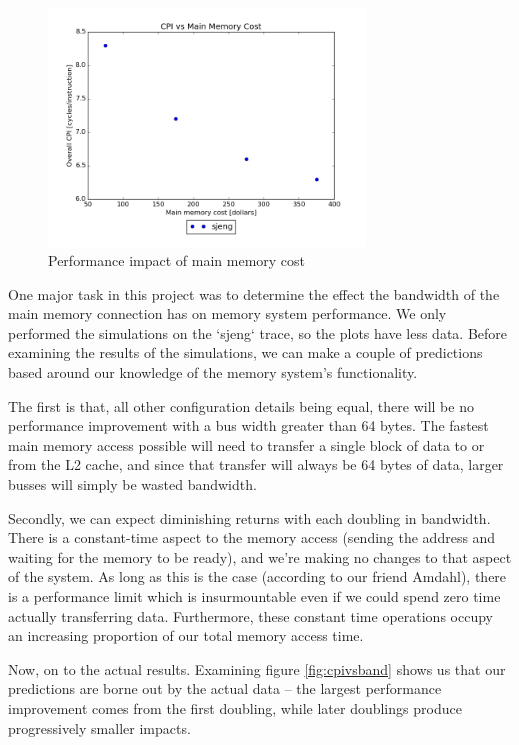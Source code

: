 \documentclass{article}
\begin{document}
\begin{figure}[ht]
    \centering
    \includegraphics[width=0.75\textwidth]{plots/CPI_vs_Main_Mem_Cost.png}
    \caption{Performance impact of main memory cost}
    \label{fig:cpivsmainmemcost}
\end{figure}

One major task in this project was to determine the effect the bandwidth of the
main memory connection has on memory system performance. We only performed the
simulations on the `sjeng` trace, so the plots have less data. Before examining
the results of the simulations, we can make a couple of predictions based around
our knowledge of the memory system's functionality.

The first is that, all other configuration details being equal, there will be no
performance improvement with a bus width greater than 64 bytes. The fastest main
memory access possible will need to transfer a single block of data to or from
the L2 cache, and since that transfer will always be 64 bytes of data, larger
busses will simply be wasted bandwidth.

Secondly, we can expect diminishing returns with each doubling in bandwidth.
There is a constant-time aspect to the memory access (sending the address and
waiting for the memory to be ready), and we're making no changes to that aspect
of the system. As long as this is the case (according to our friend Amdahl),
there is a performance limit which is insurmountable even if we could spend zero
time actually transferring data. Furthermore, these constant time operations
occupy an increasing proportion of our total memory access time.

Now, on to the actual results. Examining figure \ref{fig:cpivsband} shows us
that our predictions are borne out by the actual data -- the largest performance
improvement comes from the first doubling, while later doublings produce
progressively smaller impacts.
\end{document}
